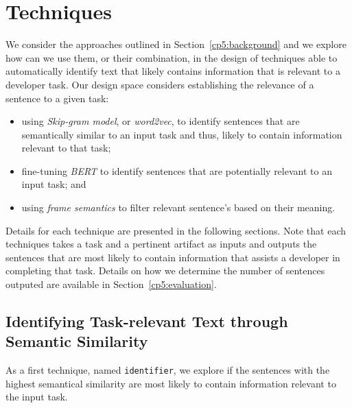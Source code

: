 \section{Techniques}
\label{cp5:approaches}




We consider the approaches outlined in Section~\ref{cp5:background} and we explore 
how can we use them, or their combination, in the design of techniques able to automatically identify text that likely contains information that is relevant to a developer task. 
Our design space considers establishing the relevance of a sentence to a given task:

\begin{itemize}
    \item using \textit{Skip-gram model}, or \textit{word2vec}, to identify sentences that are semantically similar to an input task and thus, likely to contain information relevant to that task;
    
    \item fine-tuning \textit{BERT} to identify sentences that are potentially relevant to an input task; and

    \item using \textit{frame semantics} to filter relevant sentence's based on their meaning.
\end{itemize}


Details for each technique are presented in the following sections.
Note that each techniques takes a task and a pertinent artifact as inputs and outputs the sentences 
that are most likely to contain information that assists a developer in completing that task. 
Details on how we determine the number of sentences outputed are available in Section~\ref{cp5:evaluation}.



\subsection{Identifying Task-relevant Text through Semantic Similarity}



As a first technique, named \texttt{identifier}, we explore if the sentences with the highest semantical similarity are most likely to contain information relevant to the input task. 


